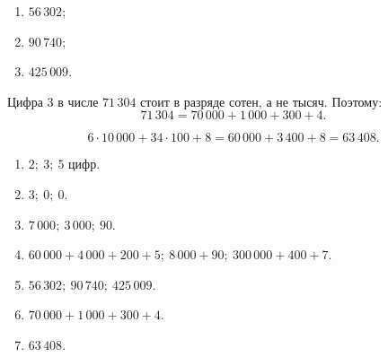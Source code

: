 \begin{teacheranswer}[Задание 5]
  \begin{enumerate}
    \item \(56\,302\);
    \item \(90\,740\);
    \item \(425\,009\).
  \end{enumerate}
\end{teacheranswer}

\begin{teacheranswer}[Задание 6]
  Цифра \(3\) в числе \(71\,304\) стоит в разряде сотен, а не тысяч.
  Поэтому:
  \[
    71\,304=70\,000+1\,000+300+4.
  \]
\end{teacheranswer}

\begin{teacheranswer}[Задание 7*]
  \[
    6\cdot10\,000+34\cdot100+8
    =60\,000+3\,400+8
    =\boxed{63\,408}.
  \]
\end{teacheranswer}

\begin{resultbox}
  \begin{enumerate}
    \item \(2;\ 3;\ 5\) цифр.
    \item \(3;\ 0;\ 0\).
    \item \(7\,000;\ 3\,000;\ 90\).
    \item \(60\,000+4\,000+200+5;\ 8\,000+90;\ 300\,000+400+7\).
    \item \(56\,302;\ 90\,740;\ 425\,009\).
    \item \(70\,000+1\,000+300+4\).
    \item \(63\,408\).
  \end{enumerate}
\end{resultbox}
